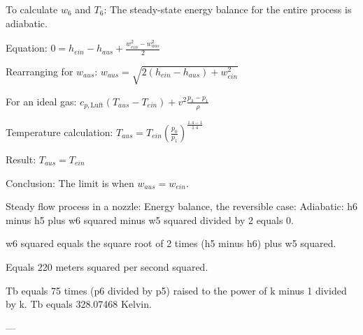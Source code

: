 To calculate \( w_6 \) and \( T_6 \):  
The steady-state energy balance for the entire process is adiabatic.  

Equation:  
\( 0 = h_{ein} - h_{aus} + \frac{w_{ein}^2 - w_{aus}^2}{2} \)  

Rearranging for \( w_{aus} \):  
\( w_{aus} = \sqrt{2(h_{ein} - h_{aus}) + w_{ein}^2} \)  

For an ideal gas:  
\( c_{p, \text{Luft}}(T_{aus} - T_{ein}) + v^2 \frac{p_3 - p_1}{\rho} \)  

Temperature calculation:  
\( T_{aus} = T_{ein} \left( \frac{p_0}{p_1} \right)^{\frac{1.4 - 1}{1.4}} \)  

Result:  
\( T_{aus} = T_{ein} \)  

Conclusion:  
The limit is when \( w_{aus} = w_{ein} \).

Steady flow process in a nozzle:  
Energy balance, the reversible case:  
Adiabatic:  
h6 minus h5 plus w6 squared minus w5 squared divided by 2 equals 0.  

w6 squared equals the square root of 2 times (h5 minus h6) plus w5 squared.  

Equals 220 meters squared per second squared.  

Tb equals 75 times (p6 divided by p5) raised to the power of k minus 1 divided by k.  
Tb equals 328.07468 Kelvin.  

---